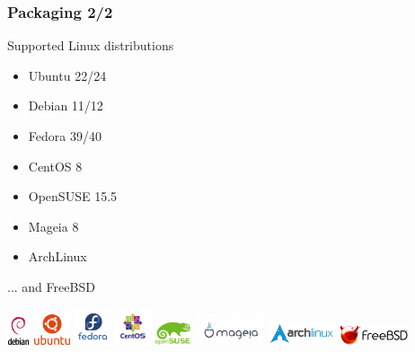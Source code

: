 \documentclass[aspectratio=169]{beamer}
\begin{document}
\begin{frame}
\frametitle{Packaging 2/2}
\begin{block}{Supported Linux distributions}
\begin{itemize}
\item Ubuntu 22/24
\item Debian 11/12
\item Fedora 39/40
\item CentOS 8
\item OpenSUSE 15.5
\item Mageia 8
\item ArchLinux
\end{itemize}

... and FreeBSD

\end{block}


\begin{center}
\includegraphics[width=0.05\textwidth]{figures/debian-openlogo-100}
\includegraphics[width=0.08\textwidth]{figures/ubuntu}
\includegraphics[width=0.08\textwidth]{figures/Fedora-Logo}
\includegraphics[width=0.08\textwidth]{figures/centos-logo}
\includegraphics[width=0.08\textwidth]{figures/opensuse-logo}
\includegraphics[width=0.15\textwidth]{figures/200px-Logo_mageia_official}
\includegraphics[width=0.15\textwidth]{figures/archlinux-logo}
\includegraphics[width=0.15\textwidth]{figures/FREEBSD_Logo_Horiz_Pos_RGB}
\end{center}

\end{frame}
\end{document}
